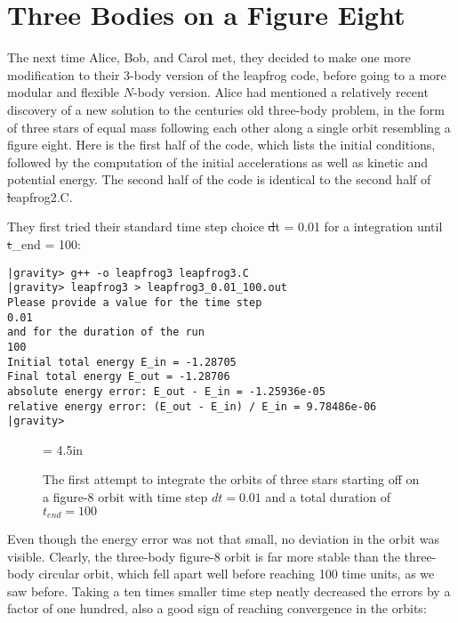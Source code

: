 \section{Three Bodies on a Figure Eight}

The next time Alice, Bob, and Carol met, they decided to make one more
modification to their 3-body version of the leapfrog code, before
going to a more modular and flexible $N$-body version.  Alice had
mentioned a relatively recent discovery of a new solution to the
centuries old three-body problem, in the form of three stars of equal
mass following each other along a single orbit resembling a figure eight.
Here is the first half of the code, which lists the initial conditions,
followed by the computation of the initial accelerations as well as
kinetic and potential energy.  The second half of the code is
identical to the second half of {\st leapfrog2.C}.


They first tried their standard time step choice {\st dt = 0.01} for a
integration until {\st t\_end = 100}:

\begin{small}
\begin{verbatim}
|gravity> g++ -o leapfrog3 leapfrog3.C
|gravity> leapfrog3 > leapfrog3_0.01_100.out
Please provide a value for the time step
0.01
and for the duration of the run
100
Initial total energy E_in = -1.28705
Final total energy E_out = -1.28706
absolute energy error: E_out - E_in = -1.25936e-05
relative energy error: (E_out - E_in) / E_in = 9.78486e-06
|gravity>
\end{verbatim}
\end{small}

\begin{figure}[htb]
\begin{center}
\epsfxsize = 4.5in
\caption[Three stars on a figure-8 orbit, $dt = 0.01$,
$t_{end} = 100$]
{The first attempt to integrate the orbits of three stars
starting off on a figure-8 orbit with time step $dt = 0.01$ and a
total duration of $t_{end} = 100$}
\label{fig:leap3-0.01-100}
\end{center}
\end{figure}

Even though the energy error was not that small, no deviation in the
orbit was visible.  Clearly, the three-body figure-8 orbit is far more
stable than the three-body circular orbit, which fell apart well
before reaching 100 time units, as we saw before.  Taking a ten times
smaller time step neatly decreased the errors by a factor of one hundred,
also a good sign of reaching convergence in the orbits:

